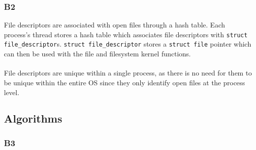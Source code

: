 \documentclass[a4wide, 11pt]{article}
\newcommand{\tx}{\texttt}
\begin{document}
\subsubsection{B2}

File descriptors are associated with open files through a hash table. Each process's thread stores a hash table which associates file descriptors with \tx{struct file\_descriptor}s. \tx{struct file\_descriptor} stores a \tx{struct file} pointer which can then be used with the file and filesystem kernel functions.
\\\\
File descriptors are unique within a single process, as there is no need for them to be unique within the entire OS since they only identify open files at the process level.

\subsection{Algorithms}
\subsubsection{B3}
\end{document}
